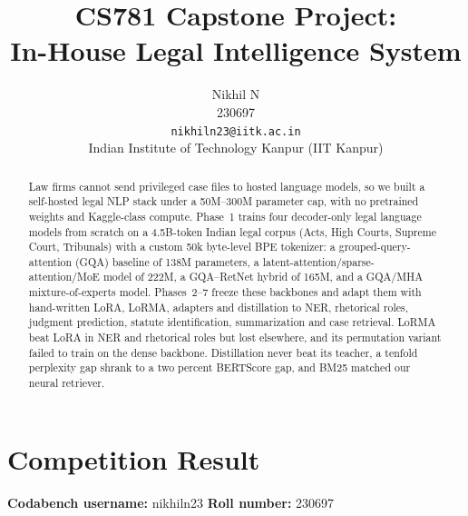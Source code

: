 \documentclass[11pt, oneside]{article}
\title{CS781 Capstone Project:\\
In-House Legal Intelligence System}
\author{
    Nikhil N \\
    230697 \\
    {\tt nikhiln23@iitk.ac.in}\\
    Indian Institute of Technology Kanpur (IIT Kanpur)
}
\date{}
\begin{document}
\maketitle
\begin{abstract}
Law firms cannot send privileged case files to hosted language models, so we built a self-hosted legal NLP stack under a 50M--300M parameter cap, with no pretrained weights and Kaggle-class compute.
Phase~1 trains four decoder-only legal language models from scratch on a 4.5B-token Indian legal corpus (Acts, High Courts, Supreme Court, Tribunals) with a custom 50k byte-level BPE tokenizer: a grouped-query-attention (GQA) baseline of 138M parameters, a latent-attention/sparse-attention/MoE model of 222M, a GQA--RetNet hybrid of 165M, and a GQA/MHA mixture-of-experts model.
Phases~2--7 freeze these backbones and adapt them with hand-written LoRA, LoRMA, adapters and distillation to NER, rhetorical roles, judgment prediction, statute identification, summarization and case retrieval.
LoRMA beat LoRA in NER and rhetorical roles but lost elsewhere, and its permutation variant failed to train on the dense backbone.
Distillation never beat its teacher, a tenfold perplexity gap shrank to a two percent BERTScore gap, and BM25 matched our neural retriever.
\end{abstract}

\section{Competition Result}
\noindent
\textbf{Codabench username:} nikhiln23
\hfill
\textbf{Roll number:} 230697
\end{document}
